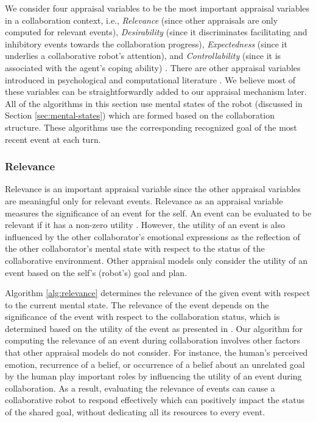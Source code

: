 We consider four appraisal variables to be the most important appraisal
variables in a collaboration context, i.e., \textit{Relevance} (since other
appraisals are only computed for relevant events), \textit{Desirability}
(since it discriminates facilitating and inhibitory events towards the
collaboration progress), \textit{Expectedness} (since it underlies a
collaborative robot's attention), and \textit{Controllability} (since it is
associated with the agent's coping ability)
\cite{shayganfar:relevance-controllability}. There are other appraisal variables
introduced in psychological \cite{scherer:appraisal-processes} and computational
literature \cite{gratch:domain-independent}. We believe most of these variables
can be straightforwardly added to our appraisal mechanism later. All of the
algorithms in this section use mental states of the robot (discussed in Section
\ref{sec:mental-states}) which are formed based on the collaboration structure.
These algorithms use the corresponding recognized goal of the most recent event
at each turn.

\subsubsection{Relevance}

Relevance is an important appraisal variable since the other appraisal variables
are meaningful only for relevant events. Relevance as an appraisal variable
measures the significance of an event for the self. An event can be evaluated to
be relevant if it has a non-zero utility \cite{marsella:ema-process-model}.
However, the utility of an event is also influenced by the other collaborator's
emotional expressions as the reflection of the other collaborator's mental state
with respect to the status of the collaborative environment. Other appraisal
models only consider the utility of an event based on the self's (robot's) goal
and plan.

Algorithm \ref{alg:relevance} determines the relevance of the given event with
respect to the current mental state. The relevance of the event depends on the
significance of the event with respect to the collaboration status, which is
determined based on the utility of the event as presented in
\cite{gratch:domain-independent,marsella:ema-process-model}. Our algorithm for
computing the relevance of an event during collaboration involves other factors
that other appraisal models do not consider. For instance, the human's
perceived emotion, recurrence of a belief, or occurrence of a belief about an
unrelated goal by the human play important roles by influencing the utility
of an event during collaboration. As a result, evaluating the relevance of
events can cause a collaborative robot to respond effectively which can
positively impact the status of the shared goal, without dedicating all its
resources to every event.

